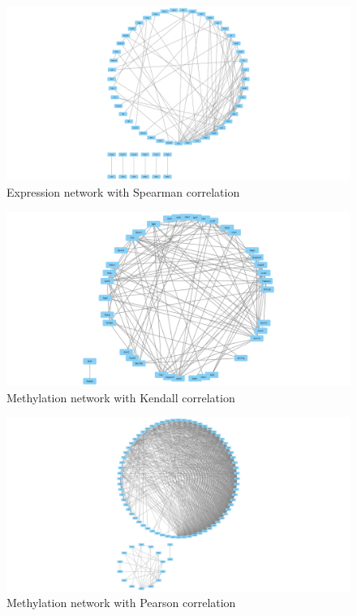 \documentclass[10pt,a4paper]{article}
\begin{document}
\begin{enumerate}
	
\begin{figure}[H]
	\centering
	\includegraphics[width=0.9\linewidth]{img/schmitt_schowing_expression_network_spearman.png}
	\caption{Expression network with Spearman correlation}
	\label{fig:schmittschowingexpressionnetworkspearman}
\end{figure}


\begin{figure}[H]
	\centering
	\includegraphics[width=0.9\linewidth]{img/schmitt_schowing_methylation_network_kendall}
	\caption{Methylation network with Kendall correlation}
	\label{fig:schmittschowingmethylationnetworkkendall}
\end{figure}



\begin{figure}[H]
	\centering
	\includegraphics[width=0.9\linewidth]{img/schmitt_schowing_methylation_network_pearson}
	\caption{Methylation network with Pearson correlation}
	\label{fig:schmittschowingmethylationnetworkpearson}
\end{figure}



\end{enumerate}
\end{document}
